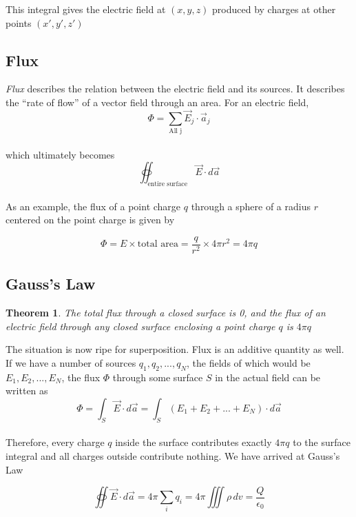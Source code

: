 \documentclass[svgnames]{article}
\newtheorem{theorem}{Theorem}		        %
\begin{document}
This integral gives the electric field at $(x,y,z)$ produced by charges at other points $(x',y',z')$

\subsection{Flux}
  

\textit{Flux} describes the relation between the electric field and its
sources. It describes the ``rate of flow'' of a vector field through an area. For an electric field, \\

\[ \Phi = \sum_{\text{All j}} \vec{E}_j \cdot \vec{a}_j \] \\

which ultimately becomes \\ 

\[ \oiint_\text{entire surface} \vec{E} \cdot d\vec{a} \] \\ 

As an example, the flux of a point charge $q$ through a sphere of a radius $r$
centered on the point charge is given by

\[ \Phi = E \times \text{total area} = \frac{q}{r^2} \times 4\pi r^2 = 4\pi q \] 

\subsection{Gauss's Law} 

\begin{theorem}
The total flux through a closed surface is 0, and the flux of an electric field
through \textit{any} closed surface enclosing a point charge $q$ is $4\pi q$ 
\end{theorem} 

The situation is now ripe for superposition. Flux is an additive quantity as
well. If we have a number of sources $q_1,q_2,...,q_N$, the fields of which
would be $E_1,E_2,...,E_N$, the flux $\Phi$ through some surface $S$ in the actual field can be written as \\

\[ \Phi = \int_S \vec{E} \cdot d\vec{a} = \int_S (E_1 + E_2 + ... + E_N) \cdot d\vec{a} \] \\

Therefore, every charge $q$ inside the surface contributes exactly $4\pi q$ to
the surface integral and all charges outside contribute nothing. We have arrived at Gauss's Law \\ 
\begin{tcolorbox}[colback = blue!5!white, colframe = blue!50!black]
\[ \oiint \vec{E} \cdot d\vec{a} = 4\pi
\sum_i q_i = 4\pi \iiint \rho \, dv =  \frac{Q}{\epsilon_0} \]  
\end{tcolorbox}
\end{document}
